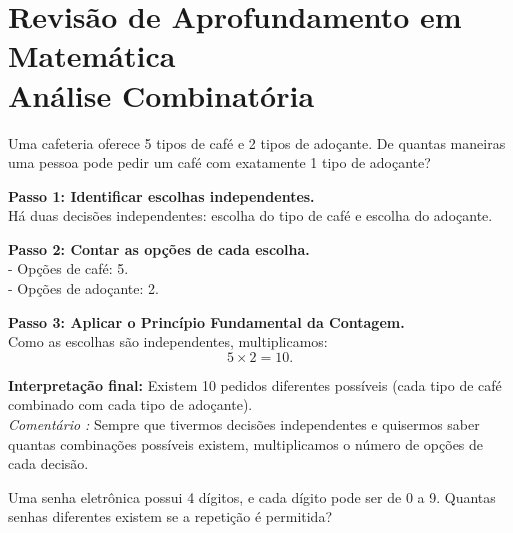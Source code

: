 \documentclass[11pt]{article}
\begin{document}
\section*{Revisão de Aprofundamento em Matemática \\ Análise Combinatória}

\begin{tcolorbox}[title=\textbf{Questão 1}, colback=blue!6, colframe=blue!70!black]
Uma cafeteria oferece 5 tipos de café e 2 tipos de adoçante. De quantas maneiras uma pessoa pode pedir um café com exatamente 1 tipo de adoçante?
\end{tcolorbox}

\begin{tcolorbox}[title=\textbf{Solução 1}, colback=green!6, colframe=green!60!black]
\textbf{Passo 1: Identificar escolhas independentes.}\\
Há duas decisões independentes: escolha do tipo de café e escolha do adoçante.

\textbf{Passo 2: Contar as opções de cada escolha.}\\
- Opções de café: 5.\\
- Opções de adoçante: 2.

\textbf{Passo 3: Aplicar o Princípio Fundamental da Contagem.}\\
Como as escolhas são independentes, multiplicamos:
\[
5 \times 2 = 10.
\]

\textbf{Interpretação final:} Existem 10 pedidos diferentes possíveis (cada tipo de café combinado com cada tipo de adoçante).\\
\emph{Comentário :} Sempre que tivermos decisões independentes e quisermos saber quantas combinações possíveis existem, multiplicamos o número de opções de cada decisão.
\end{tcolorbox}


\begin{tcolorbox}[title=\textbf{Questão 2}, colback=blue!6, colframe=blue!70!black]
Uma senha eletrônica possui 4 dígitos, e cada dígito pode ser de 0 a 9. Quantas senhas diferentes existem se a repetição é permitida?
\end{tcolorbox}
\end{document}
